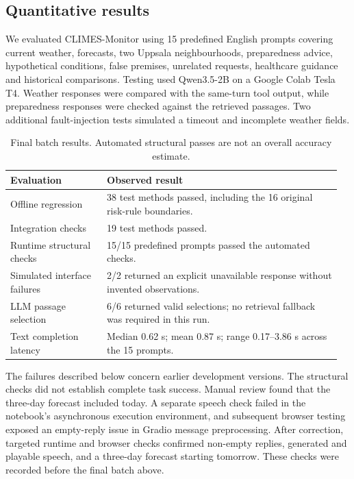 \documentclass[a4paper,10pt]{article}
\begin{document}
\subsection{Quantitative results}
We evaluated CLIMES-Monitor using 15 predefined English prompts covering current weather, forecasts, two Uppsala neighbourhoods, preparedness advice, hypothetical conditions, false premises, unrelated requests, healthcare guidance and historical comparisons. Testing used Qwen3.5-2B on a Google Colab Tesla T4. Weather responses were compared with the same-turn tool output, while preparedness responses were checked against the retrieved passages. Two additional fault-injection tests simulated a timeout and incomplete weather fields.

\begin{table}[htbp]
\centering
\small
\renewcommand{\arraystretch}{1.15}
\begin{tabular}{@{}p{0.28\linewidth}p{0.68\linewidth}@{}}
\hline
\textbf{Evaluation} & \textbf{Observed result} \\
\hline
Offline regression & 38 test methods passed, including the 16 original risk-rule boundaries. \\
Integration checks & 19 test methods passed. \\
Runtime structural checks & 15/15 predefined prompts passed the automated checks. \\
Simulated interface failures & 2/2 returned an explicit unavailable response without invented observations. \\
LLM passage selection & 6/6 returned valid selections; no retrieval fallback was required in this run. \\
Text completion latency & Median 0.62 s; mean 0.87 s; range 0.17--3.86 s across the 15 prompts. \\
\hline
\end{tabular}
\caption{Final batch results. Automated structural passes are not an overall accuracy estimate.}
\end{table}

The failures described below concern earlier development versions. The structural checks did not establish complete task success. Manual review found that the three-day forecast included today. A separate speech check failed in the notebook's asynchronous execution environment, and subsequent browser testing exposed an empty-reply issue in Gradio message preprocessing. After correction, targeted runtime and browser checks confirmed non-empty replies, generated and playable speech, and a three-day forecast starting tomorrow. These checks were recorded before the final batch above.
\end{document}
